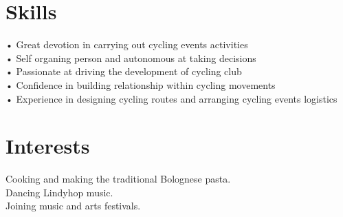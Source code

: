 \documentclass[]{friggeri-cv}
\begin{document}
\section{Skills}
\textbf{} • Great devotion in carrying out cycling events activities\\
\textbf{} • Self organing person and autonomous at taking decisions\\
\textbf{} • Passionate at driving the development of cycling club\\
\textbf{} • Confidence in building relationship within cycling movements\\
\textbf{} • Experience in designing cycling routes and arranging cycling events logistics

\section{Interests}
Cooking and making the traditional Bolognese pasta.\\
Dancing Lindyhop music.\\
Joining music and arts festivals.\\
\end{document}
